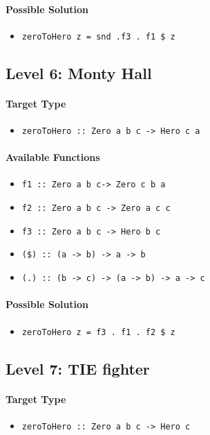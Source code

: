 \documentclass[preprint,12pt]{elsarticle}
\begin{document}
\paragraph{Possible Solution} 
\begin{itemize}
    \item \texttt{zeroToHero z = snd .f3 . f1 \$ z}
\end{itemize}


\subsection{Level 6: Monty Hall}
\paragraph{Target Type } 
\begin{itemize}
    \item \texttt{zeroToHero :: Zero a b c -> Hero c a}
\end{itemize}

\paragraph{Available Functions} 
\begin{itemize}
    \item \texttt{f1 :: Zero a b c-> Zero c b a}
    \item \texttt{f2 :: Zero a b c -> Zero a c c}
    \item \texttt{f3 :: Zero a b c -> Hero b c}
    \item \texttt{(\$) :: (a -> b) -> a -> b}
    \item \texttt{(.) :: (b -> c) -> (a -> b) -> a -> c}
\end{itemize}

\paragraph{Possible Solution} 
\begin{itemize}
    \item \texttt{zeroToHero z = f3 . f1 . f2 \$ z}
\end{itemize}

\subsection{Level 7: TIE fighter}
\paragraph{Target Type } 
\begin{itemize}
    \item \texttt{zeroToHero :: Zero a b c -> Hero c}
\end{itemize}
\end{document}
